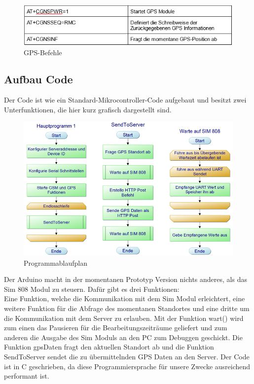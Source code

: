\begin{figure} [H]
 \begin{center}
		\includegraphics[width=1\textwidth]{Bilder/Arduino_Befehlstabelle_2.png}
		\caption{GPS-Befehle}
		\label{GPS}
	\end{center}
\end{figure}

\subsection{Aufbau Code}
Der Code ist wie ein Standard-Mikrocontroller-Code aufgebaut und besitzt zwei Unterfunktionen, die hier kurz grafisch dargestellt sind.
\begin{figure} [H]
	\begin{center}
		\includegraphics[width=1\textwidth]{Bilder/Arduino_Codeaufbau.png}
		\caption{Programmablaufplan}
		\label{PAP}
	\end{center}
\end{figure}
Der Arduino macht in der momentanen Prototyp Version nichts anderes, als das Sim 808 Modul zu steuern. Dafür gibt es drei Funktionen:
\\
Eine Funktion, welche die Kommunikation mit dem Sim Modul erleichtert, eine weitere Funktion für die Abfrage des momentanen Standortes und eine dritte um die Kommunikation mit dem Server zu erlauben. 
Mit der Funktion wart() wird zum einen das Pausieren für die Bearbeitungszeiträume geliefert und zum anderen die Ausgabe des Sim Moduls an den PC zum Debuggen geschickt. 
Die Funktion gpsDaten fragt den aktuellen Standort ab und die Funktion SendToServer sendet die zu übermittelnden GPS Daten an den Server.
Der Code ist in C geschrieben, da diese Programmiersprache für unsere Zwecke ausreichend performant ist.

